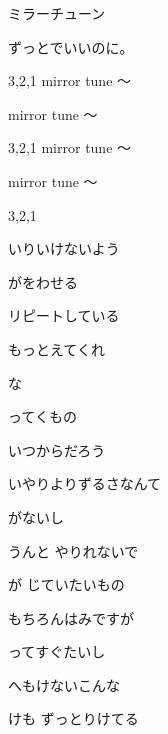 \documentclass[a4paper,tate,twocolumn,12pt]{ltjtarticle}
\begin{document}
\thispagestyle{empty}

\begin{center}
{\LARGE ミラーチューン}

{\large ずっとでいいのに。}
\end{center}

\vspace{1em}

\begin{flushleft}

\noindent\begin{minipage}{\linewidth}
3,2,1 mirror tune 〜

mirror tune 〜

3,2,1 mirror tune 〜

mirror tune 〜

3,2,1
\end{minipage}

\vspace{2em}

\noindent\begin{minipage}{\linewidth}
いりいけないよう

がをわせる

リピートしている

もっとえてくれ

な

ってくもの

いつからだろう

いやりよりずるさなんて

がないし

うんと やりれないで

が じていたいもの
\end{minipage}

\vspace{2em}

\noindent\begin{minipage}{\linewidth}
もちろんはみですが

ってすぐたいし

へもけないこんな

けも ずっとりけてる


\end{minipage}
\end{flushleft}
\end{document}
